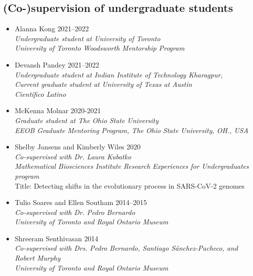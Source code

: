 \documentclass[11pt,letterpaper,sans]{moderncv} %
\begin{document}
\subsection{(Co-)supervision of undergraduate students}
\begin{itemize}
	\item Alanna Kong \hfill{2021--2022}\\
	\textit{\small Undergraduate student at University of Toronto\\
	University of Toronto Woodsworth Mentorship Program}
	
	\item Devansh Pandey \hfill{2021--2022}\\
	\textit{\small Undergraduate student at Indian Institute of Technology Kharagpur,\\
	Current graduate student at University of Texas at Austin\\
	Científico Latino}
	
	\item McKenna Molnar \hfill{2020-2021}\\
	\textit{\small Graduate student at The Ohio State University\\
	EEOB Graduate Mentoring Program, The Ohio State University, OH., USA}
	
	\item Shelby Jansens and Kimberly Wiles \hfill{2020}\\
	 {\small \textit{Co-supervised with Dr. Laura Kubatko\\
	 Mathematical Biosciences Institute Research Experiences for Undergraduates program}\\
	 Title: Detecting shifts in the evolutionary process in SARS-CoV-2 genomes}
	
	\item Tulio Soares and Ellen Southam \hfill 2014--2015\\
	\textit{\small Co-supervised with Dr. Pedro Bernardo\\
	University of Toronto and Royal Ontario Museum}
	
	\item Shreeram Senthivasan \hfill {2014}\\
	\textit{\small Co-supervised with Drs. Pedro Bernardo, Santiago Sánchez-Pacheco, and Robert Murphy\\
	 University of Toronto and Royal Ontario Museum}
\end{itemize}
\end{document}
